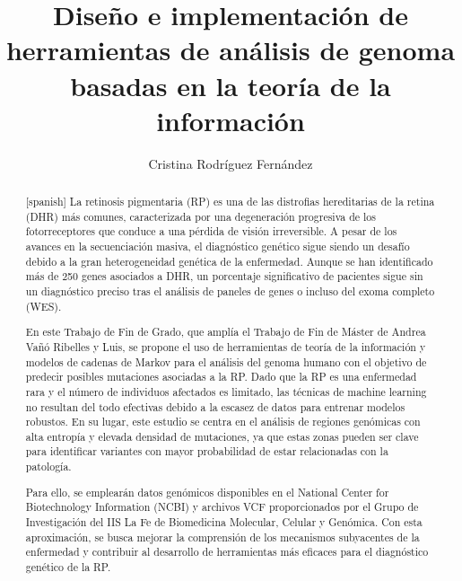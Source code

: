 \documentclass[11pt,spanish,listoffigures,listoftables]{tfgetsinf}
\title{Diseño e implementación de herramientas de análisis de genoma basadas en la teoría de la información}
\author{Cristina Rodríguez Fernández}
\begin{document}

\begin{abstract}[spanish]
   La retinosis pigmentaria (RP) es una de las distrofias hereditarias de la retina (DHR) más comunes, caracterizada por una degeneración progresiva de los fotorreceptores que conduce a una pérdida de visión irreversible. A pesar de los avances en la secuenciación masiva, el diagnóstico genético sigue siendo un desafío debido a la gran heterogeneidad genética de la enfermedad. Aunque se han identificado más de 250 genes asociados a DHR, un porcentaje significativo de pacientes sigue sin un diagnóstico preciso tras el análisis de paneles de genes o incluso del exoma completo (WES).

   En este Trabajo de Fin de Grado, que amplía el Trabajo de Fin de Máster de Andrea Vañó Ribelles y Luis, se propone el uso de herramientas de teoría de la información y modelos de cadenas de Markov para el análisis del genoma humano con el objetivo de predecir posibles mutaciones asociadas a la RP. Dado que la RP es una enfermedad rara y el número de individuos afectados es limitado, las técnicas de machine learning no resultan del todo efectivas debido a la escasez de datos para entrenar modelos robustos. En su lugar, este estudio se centra en el análisis de regiones genómicas con alta entropía y elevada densidad de mutaciones, ya que estas zonas pueden ser clave para identificar variantes con mayor probabilidad de estar relacionadas con la patología.
   
   Para ello, se emplearán datos genómicos disponibles en el National Center for Biotechnology Information (NCBI) y archivos VCF proporcionados por el Grupo de Investigación del IIS La Fe de Biomedicina Molecular, Celular y Genómica. Con esta aproximación, se busca mejorar la comprensión de los mecanismos subyacentes de la enfermedad y contribuir al desarrollo de herramientas más eficaces para el diagnóstico genético de la RP.

   \end{abstract}
\end{document}

